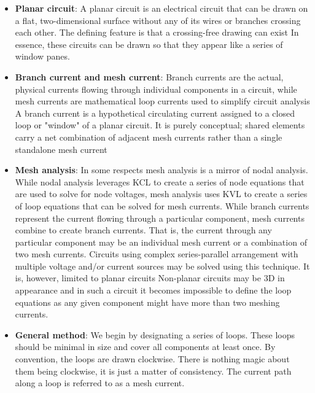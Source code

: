 \documentclass{report}
\begin{document}
\begin{itemize}
                Therefore,
                \begin{align*}
                    V_{a} &= 12.857V \\
                    V_{b} &= -47.143V
                .\end{align*}
            \item \textbf{Planar circuit}: A planar circuit is an electrical circuit that can be drawn on a flat, two-dimensional surface without any of its wires or branches crossing each other. The defining feature is that a crossing-free drawing can exist
                \bigbreak \noindent 
                In essence, these circuits can be drawn so that they appear like a series of window panes.
            \item \textbf{Branch current and mesh current}: Branch currents are the actual, physical currents flowing through individual components in a circuit, while mesh currents are mathematical loop currents used to simplify circuit analysis
                \bigbreak \noindent 
                A branch current is a hypothetical circulating current assigned to a closed loop or "window" of a planar circuit. It is purely conceptual; shared elements carry a net combination of adjacent mesh currents rather than a single standalone mesh current
            \item \textbf{Mesh analysis}: In some respects mesh analysis is a mirror of nodal analysis. While nodal analysis leverages KCL to create a series of node equations that are used to solve for node voltages, mesh analysis uses KVL to create a series of loop equations that can be solved for mesh currents. 
                \bigbreak \noindent 
                While branch currents represent the current flowing through a particular component, mesh currents combine to create branch currents. That is, the current through any particular component may be an individual mesh current or a combination of two mesh currents.
                \bigbreak \noindent 
                Circuits using complex series-parallel arrangement with multiple voltage and/or current sources may be solved using this technique. It is, however, limited to planar circuits
                \bigbreak \noindent 
                Non-planar circuits may be 3D in appearance and in such a circuit it becomes impossible to define the loop equations as any given component might have more than two meshing currents.
            \item \textbf{General method}:  We begin by designating a series of loops. These loops should be minimal in size and cover all components at least once. By convention, the loops are drawn clockwise. There is nothing magic about them being clockwise, it is just a matter of consistency. The current path along a loop is referred to as a mesh current.

\end{itemize}
\end{document}
